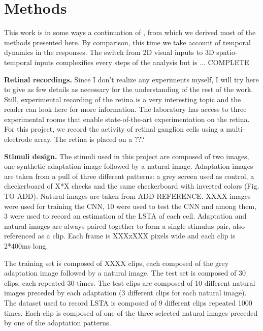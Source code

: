 \section{Methods}\label{sec:methods}

This work is in some ways a continuation of
\cite{goldin_context-dependent_2022}, from which we derived most of the methods
presented here. By comparison, this time we take account of temporal dynamics
in the responses. The switch from 2D visual inputs to 3D spatio-temporal inputs
complexifies every steps of the analysis but is ... COMPLETE

\textbf{Retinal recordings.}
Since I don't realize any experiments myself, I will try here to give as few
details
as necessary for the understanding of the rest of the work. Still, experimental
recording of the retina is a very interesting topic and the reader can look
here for more information. %
The laboratory has access to three experimental rooms that enable
state-of-the-art experimentation
on the retina.	For this project, we record the activity of retinal ganglion
cells
using a multi-electrode array. The retina is placed on a ???


\textbf{Stimuli design.}
The stimuli used in this project are composed of two images, one synthetic
adaptation image followed by a natural image. Adaptation images are taken from
a pull of three different patterns: a grey screen used as control, a
checkerboard of X*X checks and the same checkerboard with inverted colors (Fig.
TO ADD). Natural images are taken from ADD REFERENCE. XXXX images were used for
training the CNN, 10 were used to test the CNN and among them, 3 were used to
record an estimation of the LSTA of each cell.
Adaptation and natural images are always paired together to form a single
stimulus pair, also referenced as a clip. Each frame is XXXxXXX pixels wide and
each clip is 2*400ms long.


The training set is composed of XXXX clips, each composed of the grey
adaptation image followed by a natural image. The test set is composed of 30
clips, each repeated 30 times. The test clips are composed of 10 different
natural
images preceded by each adaptation (3 different clips for each natural image).
The dataset used to record LSTA is composed of 9 different clips repeated 1000
times. Each clip is composed of one of the three selected natural images
preceded by one of the adaptation patterns.

